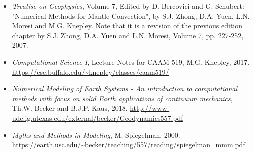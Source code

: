 
\begin{itemize} 
\item {\it Treatise on Geophysics}, Volume 7, Edited by D. Bercovici and G. Schubert: 
"Numerical Methods for Mantle Convection", by S.J. Zhong, D.A. Yuen, L.N. Moresi and M.G. Knepley. Note that it is a revision of the previous edition chapter by S.J. Zhong, D.A. Yuen and L.N. Moresi, Volume 7, pp. 227-252, 2007.

\item {\it Computational Science I}, Lecture Notes for CAAM 519, M.G. Knepley, 2017.
\url{https://cse.buffalo.edu/~knepley/classes/caam519/}

\item {\it Numerical Modeling of Earth Systems - An introduction to computational methods with focus on 
solid Earth applications of continuum mechanics}, Th.W. Becker and B.J.P. Kaus, 2018.
\url{http://www-udc.ig.utexas.edu/external/becker/Geodynamics557.pdf}

\item {\it Myths and Methods in Modeling}, M. Spiegelman, 2000.
\url{https://earth.usc.edu/~becker/teaching/557/reading/spiegelman_mmm.pdf}

\end{itemize}
